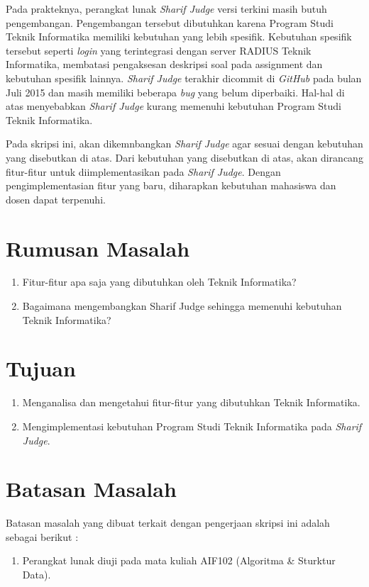 Pada prakteknya, perangkat lunak \textit{Sharif Judge} versi terkini masih butuh pengembangan. Pengembangan tersebut dibutuhkan karena Program Studi Teknik Informatika memiliki kebutuhan yang lebih spesifik. Kebutuhan spesifik tersebut seperti \textit{login} yang terintegrasi dengan server RADIUS Teknik Informatika, membatasi pengaksesan deskripsi soal pada assignment dan kebutuhan spesifik lainnya. \textit{Sharif Judge} terakhir dicommit di \textit{GitHub} pada bulan Juli 2015 dan masih memiliki beberapa \textit{bug} yang belum diperbaiki. Hal-hal di atas menyebabkan \textit{Sharif Judge} kurang memenuhi kebutuhan Program Studi Teknik Informatika. 

Pada skripsi ini, akan dikemnbangkan \textit{Sharif Judge} agar sesuai dengan kebutuhan yang disebutkan di atas. Dari kebutuhan yang disebutkan di atas, akan dirancang fitur-fitur untuk diimplementasikan pada \textit{Sharif Judge}. Dengan pengimplementasian fitur yang baru, diharapkan kebutuhan mahasiswa dan dosen dapat terpenuhi.

\section{Rumusan Masalah}
\label{sec:rumusan}
\begin{enumerate}
	\item Fitur-fitur apa saja yang dibutuhkan oleh Teknik Informatika?
	\item Bagaimana mengembangkan Sharif Judge sehingga memenuhi kebutuhan Teknik Informatika?
\end{enumerate}

\section{Tujuan}
\label{sec:tujuan}
\begin{enumerate}
	\item Menganalisa dan mengetahui fitur-fitur yang dibutuhkan Teknik Informatika.
	\item Mengimplementasi kebutuhan Program Studi Teknik Informatika pada \textit{Sharif Judge}.
\end{enumerate}

\section{Batasan Masalah}
\label{sec:batasan}
Batasan masalah yang dibuat terkait dengan pengerjaan skripsi ini adalah sebagai berikut :
\begin{enumerate}
	\item Perangkat lunak diuji pada mata kuliah AIF102 (Algoritma \& Sturktur Data).
\end{enumerate}

